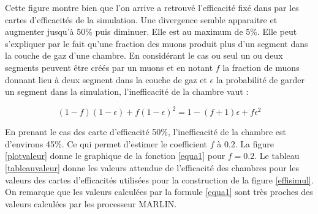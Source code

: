 Cette figure montre bien que l'on arrive a retrouvé l'efficacité fixé dans par les cartes d'efficacités de la simulation. Une divergence semble apparaitre et augmenter jusqu'à 50\% puis diminuer. Elle est au maximum de 5\%. Elle peut s'expliquer par le fait qu'une fraction des muons produit plus d'un segment dans la couche de gaz d'une chambre. En considérant le cas ou seul un ou deux segments peuvent être créés par un muons et en notant $f$ la fraction de muons donnant lieu à deux segment dans la couche de gaz et $\epsilon$ la probabilité de garder un segment dans la simulation, l'inefficacité de la chambre vaut :

\begin{equation}
(1-f)(1-\epsilon)+f(1-\epsilon)^2=1-(f+1)\epsilon+f\epsilon^2 \label{equa1}
\end{equation}

En prenant le cas des carte d'efficacité 50\%, l'inefficacité de la chambre est d'environs 45\%. Ce qui permet d'estimer le coefficient $f$ à $0.2$. La figure \ref{plotvaleur} donne le graphique de la fonction \ref{equa1} pour $f=0.2$. Le tableau \ref{tableauvaleur} donne les valeurs attendue de l'efficacité des chambres pour les valeurs des cartes d'efficacités utilisées pour la construction de la figure \ref{effisimul}. On remarque que les valeurs calculées par la formule \ref{equa1} sont très proches des valeurs calculées par les processeur MARLIN.

